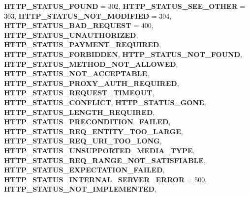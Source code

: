 \begin{DoxyCompactItemize}
{\bfseries H\+T\+T\+P\+\_\+\+S\+T\+A\+T\+U\+S\+\_\+\+F\+O\+U\+ND} = 302, 
\newline
{\bfseries H\+T\+T\+P\+\_\+\+S\+T\+A\+T\+U\+S\+\_\+\+S\+E\+E\+\_\+\+O\+T\+H\+ER} = 303, 
{\bfseries H\+T\+T\+P\+\_\+\+S\+T\+A\+T\+U\+S\+\_\+\+N\+O\+T\+\_\+\+M\+O\+D\+I\+F\+I\+ED} = 304, 
{\bfseries H\+T\+T\+P\+\_\+\+S\+T\+A\+T\+U\+S\+\_\+\+B\+A\+D\+\_\+\+R\+E\+Q\+U\+E\+ST} = 400, 
{\bfseries H\+T\+T\+P\+\_\+\+S\+T\+A\+T\+U\+S\+\_\+\+U\+N\+A\+U\+T\+H\+O\+R\+I\+Z\+ED}, 
\newline
{\bfseries H\+T\+T\+P\+\_\+\+S\+T\+A\+T\+U\+S\+\_\+\+P\+A\+Y\+M\+E\+N\+T\+\_\+\+R\+E\+Q\+U\+I\+R\+ED}, 
{\bfseries H\+T\+T\+P\+\_\+\+S\+T\+A\+T\+U\+S\+\_\+\+F\+O\+R\+B\+I\+D\+D\+EN}, 
{\bfseries H\+T\+T\+P\+\_\+\+S\+T\+A\+T\+U\+S\+\_\+\+N\+O\+T\+\_\+\+F\+O\+U\+ND}, 
{\bfseries H\+T\+T\+P\+\_\+\+S\+T\+A\+T\+U\+S\+\_\+\+M\+E\+T\+H\+O\+D\+\_\+\+N\+O\+T\+\_\+\+A\+L\+L\+O\+W\+ED}, 
\newline
{\bfseries H\+T\+T\+P\+\_\+\+S\+T\+A\+T\+U\+S\+\_\+\+N\+O\+T\+\_\+\+A\+C\+C\+E\+P\+T\+A\+B\+LE}, 
{\bfseries H\+T\+T\+P\+\_\+\+S\+T\+A\+T\+U\+S\+\_\+\+P\+R\+O\+X\+Y\+\_\+\+A\+U\+T\+H\+\_\+\+R\+E\+Q\+U\+I\+R\+ED}, 
{\bfseries H\+T\+T\+P\+\_\+\+S\+T\+A\+T\+U\+S\+\_\+\+R\+E\+Q\+U\+E\+S\+T\+\_\+\+T\+I\+M\+E\+O\+UT}, 
{\bfseries H\+T\+T\+P\+\_\+\+S\+T\+A\+T\+U\+S\+\_\+\+C\+O\+N\+F\+L\+I\+CT}, 
\newline
{\bfseries H\+T\+T\+P\+\_\+\+S\+T\+A\+T\+U\+S\+\_\+\+G\+O\+NE}, 
{\bfseries H\+T\+T\+P\+\_\+\+S\+T\+A\+T\+U\+S\+\_\+\+L\+E\+N\+G\+T\+H\+\_\+\+R\+E\+Q\+U\+I\+R\+ED}, 
{\bfseries H\+T\+T\+P\+\_\+\+S\+T\+A\+T\+U\+S\+\_\+\+P\+R\+E\+C\+O\+N\+D\+I\+T\+I\+O\+N\+\_\+\+F\+A\+I\+L\+ED}, 
{\bfseries H\+T\+T\+P\+\_\+\+S\+T\+A\+T\+U\+S\+\_\+\+R\+E\+Q\+\_\+\+E\+N\+T\+I\+T\+Y\+\_\+\+T\+O\+O\+\_\+\+L\+A\+R\+GE}, 
\newline
{\bfseries H\+T\+T\+P\+\_\+\+S\+T\+A\+T\+U\+S\+\_\+\+R\+E\+Q\+\_\+\+U\+R\+I\+\_\+\+T\+O\+O\+\_\+\+L\+O\+NG}, 
{\bfseries H\+T\+T\+P\+\_\+\+S\+T\+A\+T\+U\+S\+\_\+\+U\+N\+S\+U\+P\+P\+O\+R\+T\+E\+D\+\_\+\+M\+E\+D\+I\+A\+\_\+\+T\+Y\+PE}, 
{\bfseries H\+T\+T\+P\+\_\+\+S\+T\+A\+T\+U\+S\+\_\+\+R\+E\+Q\+\_\+\+R\+A\+N\+G\+E\+\_\+\+N\+O\+T\+\_\+\+S\+A\+T\+I\+S\+F\+I\+A\+B\+LE}, 
{\bfseries H\+T\+T\+P\+\_\+\+S\+T\+A\+T\+U\+S\+\_\+\+E\+X\+P\+E\+C\+T\+A\+T\+I\+O\+N\+\_\+\+F\+A\+I\+L\+ED}, 
\newline
{\bfseries H\+T\+T\+P\+\_\+\+S\+T\+A\+T\+U\+S\+\_\+\+I\+N\+T\+E\+R\+N\+A\+L\+\_\+\+S\+E\+R\+V\+E\+R\+\_\+\+E\+R\+R\+OR} = 500, 
{\bfseries H\+T\+T\+P\+\_\+\+S\+T\+A\+T\+U\+S\+\_\+\+N\+O\+T\+\_\+\+I\+M\+P\+L\+E\+M\+E\+N\+T\+ED}, 

\end{DoxyCompactItemize}
